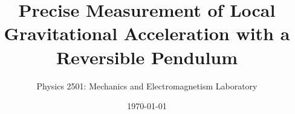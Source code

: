 \documentclass{revtex4}
\begin{document}

\title{Precise Measurement of Local Gravitational Acceleration
with a Reversible Pendulum}


\author{Physics 2501: Mechanics and Electromagnetism Laboratory}


\date{\today}




\maketitle

\end{document}
